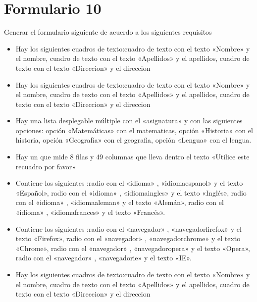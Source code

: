 \documentclass[letterpaper,10pt,spanish]{sphinxmanual}
\begin{document}
\section{Formulario 10}
\label{\detokenize{ejercicios/formularios/anexo_formularios:formulario-10}}
Generar el formulario siguiente de acuerdo a los siguientes requisitos
\begin{itemize}
\item {} 
Hay los siguientes cuadros de texto:cuadro de texto con el texto «Nombre» y el  nombre, cuadro de texto con el texto «Apellidos» y el  apellidos, cuadro de texto con el texto «Direccion» y el  direccion

\item {} 
Hay los siguientes cuadros de texto:cuadro de texto con el texto «Nombre» y el  nombre, cuadro de texto con el texto «Apellidos» y el  apellidos, cuadro de texto con el texto «Direccion» y el  direccion

\item {} 
Hay una lista desplegable múltiple con el  «asignatura» y con las siguientes opciones: opción «Matemáticas» con el  matematicas, opción «Historia» con el  historia, opción «Geografía» con el  geografia, opción «Lengua» con el  lengua.

\item {} 
Hay un  que mide 8 filas y 49 columnas que lleva dentro el texto «Utilice este recuadro por favor»

\item {} 
Contiene los siguientes :radio con el   «idioma» ,   «idiomaespanol»  y el texto «Español», radio con el   «idioma» ,   «idiomaingles»  y el texto «Inglés», radio con el   «idioma» ,   «idiomaaleman»  y el texto «Alemán», radio con el   «idioma» ,   «idiomafrances»  y el texto «Francés».

\item {} 
Contiene los siguientes :radio con el   «navegador» ,   «navegadorfirefox»  y el texto «Firefox», radio con el   «navegador» ,   «navegadorchrome»  y el texto «Chrome», radio con el   «navegador» ,   «navegadoropera»  y el texto «Opera», radio con el   «navegador» ,   «navegadorie»  y el texto «IE».

\item {} 
Hay los siguientes cuadros de texto:cuadro de texto con el texto «Nombre» y el  nombre, cuadro de texto con el texto «Apellidos» y el  apellidos, cuadro de texto con el texto «Direccion» y el  direccion

\end{itemize}
\end{document}
